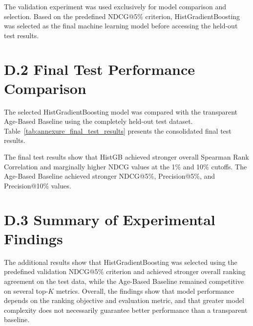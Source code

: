\documentclass[12pt,a4paper]{report}
\begin{document}
The validation experiment was used exclusively for model comparison and selection. Based on the predefined NDCG@5\% criterion, HistGradientBoosting was selected as the final machine learning model before accessing the held-out test results.

\section*{D.2 Final Test Performance Comparison}

The selected HistGradientBoosting model was compared with the transparent Age-Based Baseline using the completely held-out test dataset. Table~\ref{tab:annexure_final_test_results} presents the consolidated final test results.

\begin{table}[htbp]
\centering
\caption{Final Test Performance Comparison}
\label{tab:annexure_final_test_results}
\renewcommand{\arraystretch}{1.3}
\end{table}

The final test results show that HistGB achieved stronger overall Spearman Rank Correlation and marginally higher NDCG values at the 1\% and 10\% cutoffs. The Age-Based Baseline achieved stronger NDCG@5\%, Precision@5\%, and Precision@10\% values.

\section*{D.3 Summary of Experimental Findings}

The additional results show that HistGradientBoosting was selected using the predefined validation NDCG@5\% criterion and achieved stronger overall ranking agreement on the test data, while the Age-Based Baseline remained competitive on several top-$K$ metrics. Overall, the findings show that model performance depends on the ranking objective and evaluation metric, and that greater model complexity does not necessarily guarantee better performance than a transparent baseline.
\end{document}
